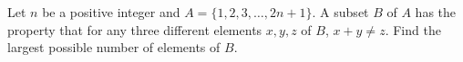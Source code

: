 Let $n$ be a positive integer and $A=\{1,2,3,\ldots,2n+1\}$. A subset $B$ of $A$ has the property that for any three different elements $x,y,z$ of $B$, $x+y\ne z$. Find the largest possible number of elements of $B$.
